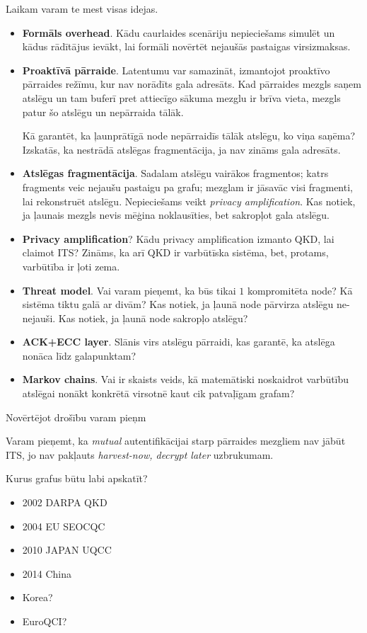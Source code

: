 \documentclass[journal]{IEEEtran}
\begin{document}
Laikam varam te mest visas idejas.


\begin{itemize}
    \item \textbf{Formāls overhead}. Kādu caurlaides scenāriju nepieciešams simulēt un kādus rādītājus ievākt, lai formāli novērtēt nejaušās pastaigas virsizmaksas.
    \item \textbf{Proaktīvā pārraide}. Latentumu var samazināt, izmantojot proaktīvo pārraides režīmu, kur nav norādīts gala adresāts. Kad pārraides mezgls saņem atslēgu un tam buferī pret attiecīgo sākuma mezglu ir brīva vieta, mezgls patur šo atslēgu un nepārraida tālāk. 
    
    Kā garantēt, ka ļaunprātīgā node nepārraidīs tālāk atslēgu, ko viņa saņēma? Izskatās, ka nestrādā atslēgas fragmentācija, ja nav zināms gala adresāts.
    \item \textbf{Atslēgas fragmentācija}. Sadalam atslēgu vairākos fragmentos; katrs fragments veic nejaušu pastaigu pa grafu; mezglam ir jāsavāc visi fragmenti, lai rekonstruēt atslēgu. Nepieciešams veikt \textit{privacy amplification}. Kas notiek, ja ļaunais mezgls nevis mēģina noklausīties, bet sakropļot gala atslēgu.
    \item \textbf{Privacy amplification}? Kādu privacy amplification izmanto QKD, lai claimot ITS? Zināms, ka arī QKD ir varbūtīska sistēma, bet, protams, varbūtība ir ļoti zema.
    \item \textbf{Threat model}. Vai varam pieņemt, ka būs tikai $1$ kompromitēta node? Kā sistēma tiktu galā ar divām? Kas notiek, ja ļaunā node pārvirza atslēgu ne-nejauši. Kas notiek, ja ļaunā node sakropļo atslēgu?
    \item \textbf{ACK+ECC layer}. Slānis virs atslēgu pārraidi, kas garantē, ka atslēga nonāca līdz galapunktam?
    \item \textbf{Markov chains}. Vai ir skaists veids, kā matemātiski noskaidrot varbūtību atslēgai nonākt konkrētā virsotnē kaut cik patvaļīgam grafam?
\end{itemize}


Novērtējot drošību varam pieņm

Varam pieņemt, ka \textit{mutual} autentifikācijai starp pārraides mezgliem nav jābūt ITS, jo nav pakļauts \textit{harvest-now, decrypt later} uzbrukumam.

Kurus grafus būtu labi apskatīt?

\begin{itemize}
    \item 2002 DARPA QKD
    \item 2004 EU SEOCQC
    \item 2010 JAPAN UQCC
    \item 2014 China
    \item Korea?
    \item EuroQCI?
\end{itemize}
\end{document}
